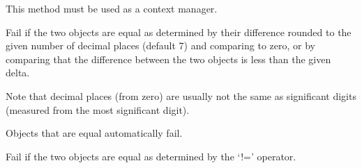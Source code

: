 \documentclass[letterpaper,10pt,english]{sphinxmanual}
\begin{document}
\begin{fulllineitems}
\begin{fulllineitems}
\sphinxAtStartPar
This method must be used as a context manager.

\end{fulllineitems}


\begin{fulllineitems}
\label{\detokenize{_autosummary/tests.test_unit.test_sqlite:tests.test_unit.test_sqlite.assertNotAlmostEqual}}
\pysigstartsignatures
{}
\pysigstopsignatures
\sphinxAtStartPar
Fail if the two objects are equal as determined by their
difference rounded to the given number of decimal places
(default 7) and comparing to zero, or by comparing that the
difference between the two objects is less than the given delta.

\sphinxAtStartPar
Note that decimal places (from zero) are usually not the same
as significant digits (measured from the most significant digit).

\sphinxAtStartPar
Objects that are equal automatically fail.

\end{fulllineitems}


\begin{fulllineitems}
\label{\detokenize{_autosummary/tests.test_unit.test_sqlite:tests.test_unit.test_sqlite.assertNotEqual}}
\pysigstartsignatures
{}
\pysigstopsignatures
\sphinxAtStartPar
Fail if the two objects are equal as determined by the ‘!=’
operator.

\end{fulllineitems}



\end{fulllineitems}
\end{document}

